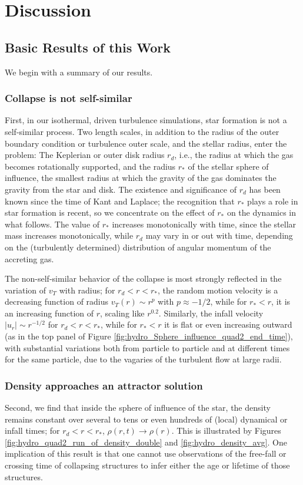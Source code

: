 \documentclass[../dissertation.tex]{subfiles}
\begin{document}
%
\section{Discussion}\label{sec:hydro_discussion}
\subsection{Basic Results of this Work}
We begin with a summary of our results. 

\subsubsection{Collapse is not self-similar}
First, in our isothermal, driven turbulence simulations, star formation is not a self-similar process. 
Two length scales, in addition to the radius of the outer boundary condition or turbulence outer scale, 
and the stellar radius, enter the problem: 
The Keplerian or outer disk radius $r_d$, i.e., the radius at which the gas becomes rotationally supported, and 
the radius $r_*$ of the stellar sphere of influence, the smallest radius at 
which the gravity of the gas dominates the gravity from the star and disk. 
The existence and significance of $r_d$ has been known since the time of 
Kant and Laplace; the recognition that $r_*$ plays a role in star formation 
is recent, so we concentrate on the effect of $r_*$ on the dynamics in 
what follows. The value of $r_*$ increases monotonically with time, since 
the stellar mass increases monotonically, while $r_d$ may vary in or out 
with time, depending on the (turbulently determined) distribution of 
angular momentum of the accreting gas. 

The non-self-similar behavior of the collapse is most strongly reflected in the
variation of $v_T$ with radius; for $r_d<r<r_*$, the 
random motion velocity is a decreasing function of radius 
$v_T(r)\sim r^{p}$ with $p\approx -1/2$, while for $r_*<r$, it is
an increasing function of $r$, scaling like $r^{0.2}$.
Similarly, the infall velocity $|u_r|\sim r^{-1/2}$ for $r_d<r<r_*$,  
while for $r_*<r$ it is flat or even increasing outward (as in the top 
panel of Figure \ref{fig:hydro_Sphere_influence_quad2_end_time}), 
with substantial variations both from particle to particle and at different times
for the same particle, due to the vagaries of the turbulent flow at large radii. 

\subsubsection{Density approaches an attractor solution}
Second, we find that inside the sphere of influence of the star, the density 
remains constant over several to tens or even hundreds of (local) dynamical 
or infall times;  for $r_d<r<r_*$, $\rho(r,t)\to\rho(r)$. This is illustrated 
by Figures \ref{fig:hydro_quad2_run_of_density_double} and \ref{fig:hydro_density_avg}. 
One implication of this result is that one cannot use observations of the 
free-fall or crossing time of collapsing structures to infer either the age 
or lifetime of those structures.
\end{document}
